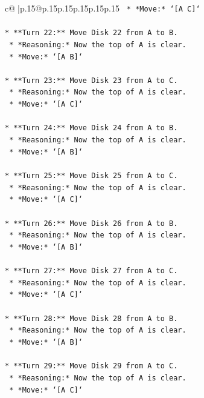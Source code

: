 \documentclass{article}
\begin{document}
{\begin{supertabular}{c@{$\;$}|p{.15\linewidth}@{}p{.15\linewidth}p{.15\linewidth}p{.15\linewidth}p{.15\linewidth}p{.15\linewidth}}
{{{\texttt{    *   *Move:* `{[}A C{]}`} \\
\\ 
\texttt{*   **Turn 22:** Move Disk 22 from A to B.} \\
\texttt{    *   *Reasoning:* Now the top of A is clear.} \\
\texttt{    *   *Move:* `{[}A B{]}`} \\
\\ 
\texttt{*   **Turn 23:** Move Disk 23 from A to C.} \\
\texttt{    *   *Reasoning:* Now the top of A is clear.} \\
\texttt{    *   *Move:* `{[}A C{]}`} \\
\\ 
\texttt{*   **Turn 24:** Move Disk 24 from A to B.} \\
\texttt{    *   *Reasoning:* Now the top of A is clear.} \\
\texttt{    *   *Move:* `{[}A B{]}`} \\
\\ 
\texttt{*   **Turn 25:** Move Disk 25 from A to C.} \\
\texttt{    *   *Reasoning:* Now the top of A is clear.} \\
\texttt{    *   *Move:* `{[}A C{]}`} \\
\\ 
\texttt{*   **Turn 26:** Move Disk 26 from A to B.} \\
\texttt{    *   *Reasoning:* Now the top of A is clear.} \\
\texttt{    *   *Move:* `{[}A B{]}`} \\
\\ 
\texttt{*   **Turn 27:** Move Disk 27 from A to C.} \\
\texttt{    *   *Reasoning:* Now the top of A is clear.} \\
\texttt{    *   *Move:* `{[}A C{]}`} \\
\\ 
\texttt{*   **Turn 28:** Move Disk 28 from A to B.} \\
\texttt{    *   *Reasoning:* Now the top of A is clear.} \\
\texttt{    *   *Move:* `{[}A B{]}`} \\
\\ 
\texttt{*   **Turn 29:** Move Disk 29 from A to C.} \\
\texttt{    *   *Reasoning:* Now the top of A is clear.} \\
\texttt{    *   *Move:* `{[}A C{]}`} \\
}}}
\end{supertabular}}
\end{document}
